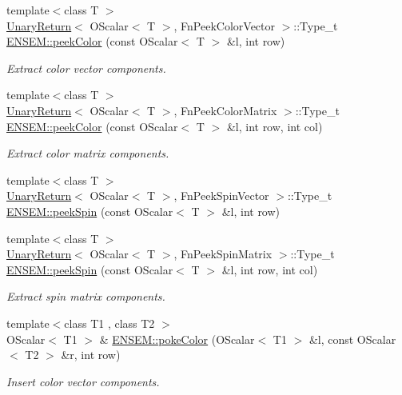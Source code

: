 \begin{DoxyCompactItemize}
\item 
{\footnotesize template$<$class T $>$ }\\\mbox{\hyperlink{structUnaryReturn}{Unary\+Return}}$<$ O\+Scalar$<$ T $>$, Fn\+Peek\+Color\+Vector $>$\+::Type\+\_\+t \mbox{\hyperlink{group__obsscalar_ga8f3e69e2d0f4a46a99f719e70d6a13d8}{E\+N\+S\+E\+M\+::peek\+Color}} (const O\+Scalar$<$ T $>$ \&l, int row)
\begin{DoxyCompactList}\small\item\em Extract color vector components. \end{DoxyCompactList}\item 
{\footnotesize template$<$class T $>$ }\\\mbox{\hyperlink{structUnaryReturn}{Unary\+Return}}$<$ O\+Scalar$<$ T $>$, Fn\+Peek\+Color\+Matrix $>$\+::Type\+\_\+t \mbox{\hyperlink{group__obsscalar_gabb496d1fb0c0682ec483697e6dae0e32}{E\+N\+S\+E\+M\+::peek\+Color}} (const O\+Scalar$<$ T $>$ \&l, int row, int col)
\begin{DoxyCompactList}\small\item\em Extract color matrix components. \end{DoxyCompactList}\item 
{\footnotesize template$<$class T $>$ }\\\mbox{\hyperlink{structUnaryReturn}{Unary\+Return}}$<$ O\+Scalar$<$ T $>$, Fn\+Peek\+Spin\+Vector $>$\+::Type\+\_\+t \mbox{\hyperlink{group__obsscalar_gad99eae88a001d667225b11a6f8b73d7e}{E\+N\+S\+E\+M\+::peek\+Spin}} (const O\+Scalar$<$ T $>$ \&l, int row)
\item 
{\footnotesize template$<$class T $>$ }\\\mbox{\hyperlink{structUnaryReturn}{Unary\+Return}}$<$ O\+Scalar$<$ T $>$, Fn\+Peek\+Spin\+Matrix $>$\+::Type\+\_\+t \mbox{\hyperlink{group__obsscalar_ga9ce0c024aa13d3c00740b9a82d2912db}{E\+N\+S\+E\+M\+::peek\+Spin}} (const O\+Scalar$<$ T $>$ \&l, int row, int col)
\begin{DoxyCompactList}\small\item\em Extract spin matrix components. \end{DoxyCompactList}\item 
{\footnotesize template$<$class T1 , class T2 $>$ }\\O\+Scalar$<$ T1 $>$ \& \mbox{\hyperlink{group__obsscalar_ga0a369092bcae6deacc6b6a1a5177ddb1}{E\+N\+S\+E\+M\+::poke\+Color}} (O\+Scalar$<$ T1 $>$ \&l, const O\+Scalar$<$ T2 $>$ \&r, int row)
\begin{DoxyCompactList}\small\item\em Insert color vector components. \end{DoxyCompactList}\item 

\end{DoxyCompactItemize}
